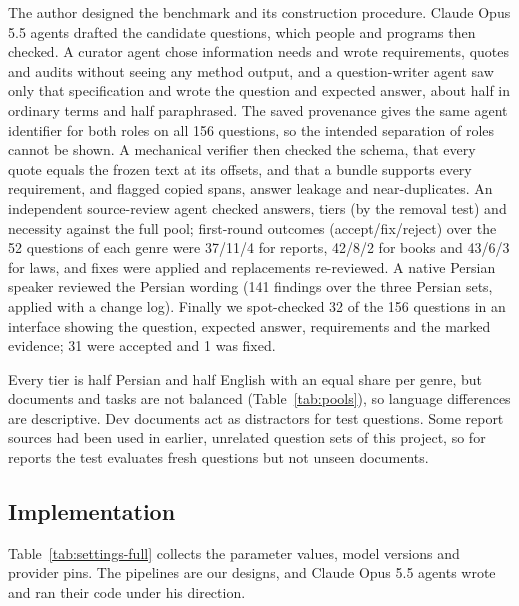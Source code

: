 The author designed the benchmark and its construction procedure. Claude Opus 5.5 agents drafted the candidate questions, which people and programs then checked. A curator agent chose information needs and wrote requirements, quotes and audits without seeing any method output, and a question-writer agent saw only that specification and wrote the question and expected answer, about half in ordinary terms and half paraphrased. The saved provenance gives the same agent identifier for both roles on all 156 questions, so the intended separation of roles cannot be shown.
A mechanical verifier then checked the schema, that every quote equals the frozen text at its offsets, and that a bundle supports every requirement, and flagged copied spans, answer leakage and near-duplicates. An independent source-review agent checked answers, tiers (by the removal test) and necessity against the full pool; first-round outcomes (accept/fix/reject) over the 52 questions of each genre were 37/11/4 for reports, 42/8/2 for books and 43/6/3 for laws, and fixes were applied and replacements re-reviewed.
A native Persian speaker reviewed the Persian wording (141 findings over the three Persian sets, applied with a change log).
Finally we spot-checked 32 of the 156 questions in an interface showing the question, expected answer, requirements and the marked evidence; 31 were accepted and 1 was fixed.

Every tier is half Persian and half English with an equal share per genre, but documents and tasks are not balanced (Table~\ref{tab:pools}), so language differences are descriptive. Dev documents act as distractors for test questions. Some report sources had been used in earlier, unrelated question sets of this project, so for reports the test evaluates fresh questions but not unseen documents.

\subsection{Implementation}
\label{app:implementation}
Table~\ref{tab:settings-full} collects the parameter values, model versions and provider pins. The pipelines are our designs, and Claude Opus 5.5 agents wrote and ran their code under his direction.

